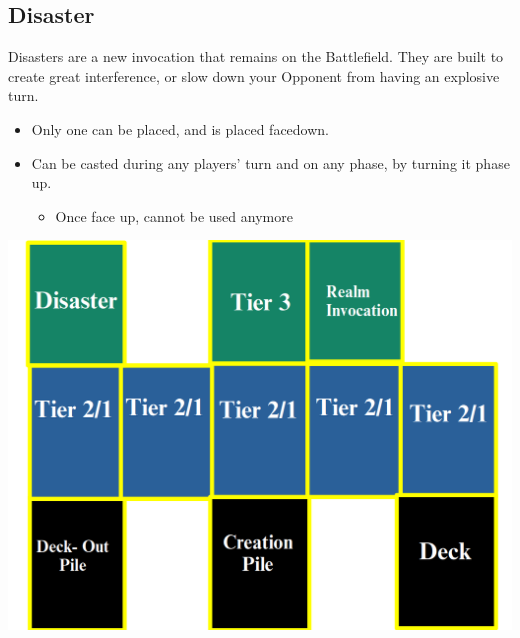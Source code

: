 \subsection{Disaster}
Disasters are a new invocation that remains on the Battlefield. They are built to create 
great interference, or slow down your Opponent from having an explosive turn. 

\begin{itemize}
    \item Only one can be placed, and is placed facedown. 
    \item Can be casted during any players' turn and on any phase, by turning it phase up. 
        \begin{itemize}
            \item Once face up, cannot be used anymore
        \end{itemize}
\end{itemize}

\begin{center}
    \includegraphics[scale = 0.25]{images/FV2.4.png}
\end{center}